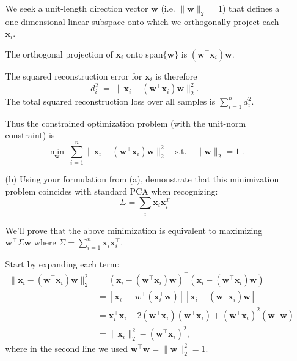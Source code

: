 \documentclass[11pt,addpoints,answers]{exam}
\begin{document}
\begin{enumerate}
\begin{enumerate}
\begin{your_solution}
				We seek a unit-length direction vector \(\mathbf{w}\) (i.e. \(\|\mathbf{w}\|_2=1\)) that defines a one-dimensional linear subspace onto which we orthogonally project each \(\mathbf{x}_i\). 
				
				The orthogonal projection of \(\mathbf{x}_i\) onto span\(\{\mathbf w\}\) is \((\mathbf w^\top \mathbf x_i)\mathbf w\). 
				
				The squared reconstruction error for \(\mathbf x_i\) is therefore
				\[
				d_i^2 \;=\; \big\| \mathbf{x}_i - (\mathbf w^\top \mathbf{x}_i)\mathbf w\big\|_2^2.
				\]
				The total squared reconstruction loss over all samples is \(\sum_{i=1}^n d_i^2\). 
				
				Thus the constrained optimization problem (with the unit-norm constraint) is
				\[
				\boxed{ \;\min_{\mathbf w}\; \sum_{i=1}^n \big\| \mathbf{x}_i - (\mathbf w^\top \mathbf{x}_i)\mathbf w\big\|_2^2
				\quad\text{s.t.}\quad \|\mathbf w\|_2 = 1 \; }.
				\]

			\end{your_solution}
			\item[(b)] Using your formulation from (a), demonstrate that this minimization problem coincides with standard PCA when recognizing: 
			\[
			\Sigma = \sum_{i} \mathbf{x}_{i} \mathbf{x}_{i}^{T}
			\]

			\begin{your_solution}
				We'll prove that the above minimization is equivalent to maximizing \(\mathbf w^\top \Sigma \mathbf w\) where \(\Sigma=\sum_{i=1}^n \mathbf x_i\mathbf x_i^\top\).

				Start by expanding each term:
				\[
				\begin{aligned}
				\big\| \mathbf{x}_i - (\mathbf w^\top \mathbf{x}_i)\mathbf w\big\|_2^2
				&= (\mathbf{x}_i - (\mathbf w^\top \mathbf{x}_i)\mathbf w)^\top(\mathbf{x}_i - (\mathbf w^\top \mathbf{x}_i)\mathbf w) \\
				&= \left[\mathbf{x}_i^\top - w^\top(\mathbf{x}_i^\top \mathbf w)\right]\left[\mathbf{x}_i - (\mathbf w^\top \mathbf{x}_i)\mathbf w\right] \\
				&= \mathbf{x}_i^\top \mathbf{x}_i - 2(\mathbf w^\top \mathbf{x}_i)(\mathbf w^\top \mathbf{x}_i) + (\mathbf w^\top \mathbf{x}_i)^2(\mathbf w^\top \mathbf w) \\
				&= \|\mathbf{x}_i\|_2^2 - (\mathbf w^\top \mathbf{x}_i)^2,
				\end{aligned}
				\]
				where in the second line we used \(\mathbf w^\top\mathbf w = \|\mathbf{w}\|_2^2=1\). 
				

\end{your_solution}
\end{enumerate}
\end{enumerate}
\end{document}
